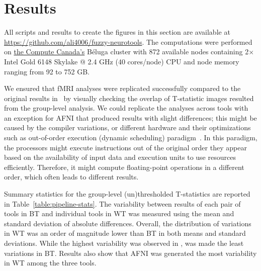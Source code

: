 \documentclass[conference]{IEEEtran}
\begin{document}
\section{Results}
All scripts and results to create the figures in this section are available at \url{https://github.com/ali4006/fuzzy-neurotools}.
The computations were performed on \href{https://www.computecanada.ca}{the Compute Canada's} Béluga cluster
with 872 available nodes containing 2× Intel Gold 6148 Skylake @ 2.4 GHz (40 cores/node) CPU and node memory ranging from 92 to 752 GB.

We ensured that fMRI analyses were replicated successfully compared to the original results in~\cite{bowring2019exploring}
by visually checking the overlap of T-statistic images resulted from the group-level analysis.
We could replicate the analyses across tools with an exception for AFNI that produced results with slight differences; 
this might be caused by the compiler variations, or different hardware and their optimizations
such as out-of-order execution (dynamic scheduling) paradigm~\cite{duben2014use,demmel2013numerical}.
In this paradigm, the processors might execute instructions out of the original order they appear based on
the availability of input data and execution units to use resources efficiently. Therefore, it might
compute floating-point operations in a different order, which often leads to different results.

Summary statistics for the group-level (un)thresholded T-statistics are reported in Table~\ref{table:pipeline-stats}.
The variability between results of each pair of tools in BT and individual tools in WT was measured using the mean and standard deviation of absolute differences.
Overall, the distribution of variations in WT was an order of magnitude lower than BT in both means and standard deviations.
While the highest variability was observed in \fslafni, \fslspm was made the least variations in BT.
Results also show that AFNI was generated the most variability in WT among the three tools.
\end{document}
